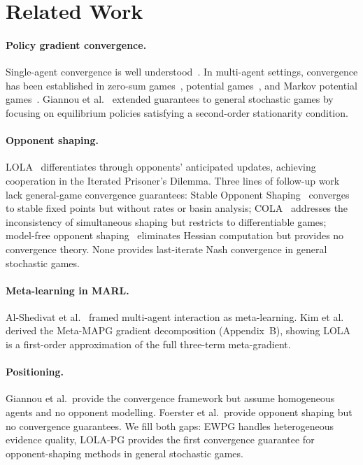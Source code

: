 \documentclass[a4paper,oneside,11pt]{report}
\begin{document}
\section{Related Work}

\paragraph{Policy gradient convergence.} Single-agent convergence is well understood~\cite{agarwal2021theory,mei2020global}. In multi-agent settings, convergence has been established in zero-sum games~\cite{daskalakis2018training}, potential games~\cite{leonardos2022global}, and Markov potential games~\cite{cen2021fast}. Giannou et al.~\cite{giannou2022} extended guarantees to general stochastic games by focusing on equilibrium policies satisfying a second-order stationarity condition.

\paragraph{Opponent shaping.} LOLA~\cite{foerster2018lola} differentiates through opponents' anticipated updates, achieving cooperation in the Iterated Prisoner's Dilemma. Three lines of follow-up work lack general-game convergence guarantees: Stable Opponent Shaping~\cite{letcher2019} converges to stable fixed points but without rates or basin analysis; COLA~\cite{willi2022cola} addresses the inconsistency of simultaneous shaping but restricts to differentiable games; model-free opponent shaping~\cite{lu2022model} eliminates Hessian computation but provides no convergence theory. None provides last-iterate Nash convergence in general stochastic games.

\paragraph{Meta-learning in MARL.} Al-Shedivat et al.~\cite{alshedivat2018} framed multi-agent interaction as meta-learning. Kim et al.~\cite{kim2021policygradientalgorithmlearning} derived the Meta-MAPG gradient decomposition (Appendix~B), showing LOLA is a first-order approximation of the full three-term meta-gradient.

\paragraph{Positioning.} Giannou et al.\ provide the convergence framework but assume homogeneous agents and no opponent modelling. Foerster et al.\ provide opponent shaping but no convergence guarantees. We fill both gaps: EWPG handles heterogeneous evidence quality, LOLA-PG provides the first convergence guarantee for opponent-shaping methods in general stochastic games.
\end{document}
